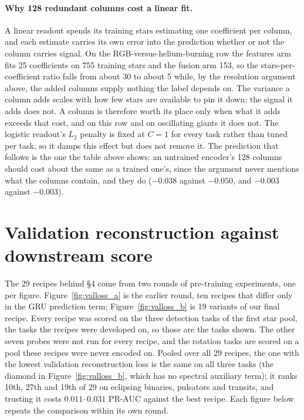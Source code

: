 \documentclass{article}
\begin{document}
\paragraph{Why 128 redundant columns cost a linear fit.} A linear readout spends its training stars
estimating one coefficient per column, and each estimate carries its own error into the prediction
whether or not the column carries signal. On the RGB-versus-helium-burning row the features arm fits
25 coefficients on 755 training stars and the fusion arm 153, so the stars-per-coefficient ratio
falls from about 30 to about 5 while, by the resolution argument above, the added columns supply
nothing the label depends on. The variance a column adds scales with how few stars are available to
pin it down; the signal it adds does not. A column is therefore worth its place only when what it
adds exceeds that cost, and on this row and on oscillating giants it does not. The logistic readout's
$L_{2}$ penalty is fixed at $C = 1$ for every task rather than tuned per task, so it damps this effect
but does not remove it. The prediction that follows is the one the table above shows: an untrained
encoder's 128 columns should cost about the same as a trained one's, since the argument never
mentions what the columns contain, and they do ($-0.038$ against $-0.050$, and $-0.003$ against
$-0.003$).

\section{Validation reconstruction against downstream score}
\label{app:valloss}

The 29 recipes behind \S4 come from two rounds of pre-training experiments, one per figure.
Figure~\ref{fig:valloss_a} is the earlier round, ten recipes that differ only in the GRU prediction
term; Figure~\ref{fig:valloss_b} is 19 variants of our final recipe. Every recipe was scored on the
three detection tasks of the first star pool, the tasks the recipes were developed on, so those are the
tasks shown. The other seven probes were not run for every recipe, and the rotation tasks are scored
on a pool these recipes were never encoded on. Pooled over all 29 recipes, the one with the lowest
validation reconstruction loss is the same on all three tasks (the diamond in
Figure~\ref{fig:valloss_b}, which has no spectral auxiliary term); it ranks 10th, 27th and 19th of 29
on eclipsing binaries, pulsators and transits, and trusting it costs $0.011$--$0.031$ PR-AUC against
the best recipe. Each figure below repeats the comparison within its own round.
\end{document}

